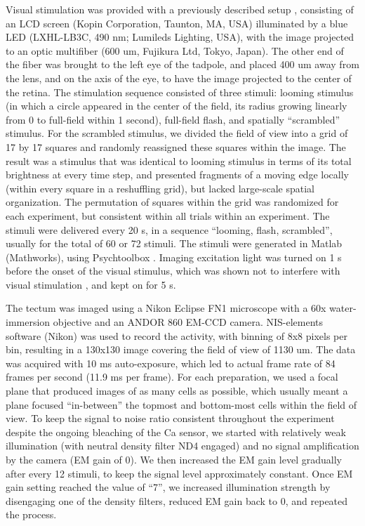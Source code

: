 \documentclass{article}
\begin{document}
Visual stimulation was provided with a previously described setup \citep{khakhalin2014}, consisting of an LCD screen (Kopin Corporation, Taunton, MA, USA) illuminated by a blue LED (LXHL-LB3C, 490 nm; Lumileds Lighting, USA), with the image projected to an optic multifiber (600 um, Fujikura Ltd, Tokyo, Japan). The other end of the fiber was brought to the left eye of the tadpole, and placed 400 um away from the lens, and on the axis of the eye, to have the image projected to the center of the retina. The stimulation sequence consisted of three stimuli: looming stimulus (in which a circle appeared in the center of the field, its radius growing linearly from 0 to full-field within 1 second), full-field flash, and spatially “scrambled” stimulus. For the scrambled stimulus, we divided the field of view into a grid of 17 by 17 squares and randomly reassigned these squares within the image. The result was a stimulus that was identical to looming stimulus in terms of its total brightness at every time step, and presented fragments of a moving edge locally (within every square in a reshuffling grid), but lacked large-scale spatial organization. The permutation of squares within the grid was randomized for each experiment, but consistent within all trials within an experiment. The stimuli were delivered every 20 s, in a sequence “looming, flash, scrambled”, usually for the total of 60 or 72 stimuli. The stimuli were generated in Matlab (Mathworks), using Psychtoolbox \citep{kleiner2007psychtoolbox}. Imaging excitation light was turned on 1 s before the onset of the visual stimulus, which was shown not to interfere with visual stimulation \citep{xu2011}, and kept on for 5 s.

The tectum was imaged using a Nikon Eclipse FN1 microscope with a 60x water-immersion objective and an ANDOR 860 EM-CCD camera. NIS-elements software (Nikon) was used to record the activity, with binning of 8x8 pixels per bin, resulting in a 130x130 image covering the field of view of 1130 um. The data was acquired with 10 ms auto-exposure, which led to actual frame rate of 84 frames per second (11.9 ms per frame). For each preparation, we used a focal plane that produced images of as many cells as possible, which usually meant a plane focused “in-between” the topmost and bottom-most cells within the field of view. To keep the signal to noise ratio consistent throughout the experiment despite the ongoing bleaching of the Ca sensor, we started with relatively weak illumination (with neutral density filter ND4 engaged) and no signal amplification by the camera (EM gain of 0). We then increased the EM gain level gradually after every 12 stimuli, to keep the signal level approximately constant. Once EM gain setting reached the value of “7”, we increased illumination strength by disengaging one of the density filters, reduced EM gain back to 0, and repeated the process.
\end{document}
